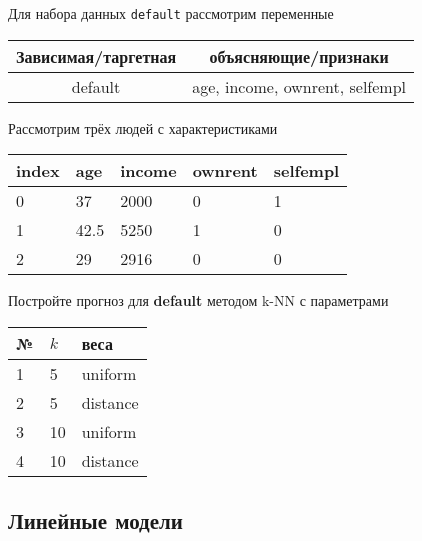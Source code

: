 \begin{exercise}
Для набора данных \texttt{default} рассмотрим переменные
\begin{center}
	\begin{tabular}{|c|c|} \hline
		Зависимая/таргетная & объясняющие/признаки \\ \hline
		default & age, income, ownrent, selfempl \\ \hline
	\end{tabular}
\end{center}
Рассмотрим трёх людей с характеристиками
	\begin{center}
		\begin{tabular}{|l||l|l|l|l|}\hline
			index & age & income & ownrent & selfempl  \\ \hline\hline
			0 & 37 & 2000 & 0 & 1  \\
			1 & 42.5 & 5250 & 1 & 0  \\
			2 & 29 & 2916 & 0 & 0  \\ \hline
		\end{tabular}
	\end{center}
Постройте прогноз для \textbf{default} методом k-NN с параметрами
\begin{center}
	\begin{tabular}{|l|l|l|}\hline
	№ & \(k\) & веса \\ \hline
	1 & 5 & uniform \\
	2 & 5 & distance \\
	3 & 10 & uniform \\
	4 & 10 & distance \\ \hline
	\end{tabular}
\end{center}
\end{exercise}

\subsection{Линейные модели}

